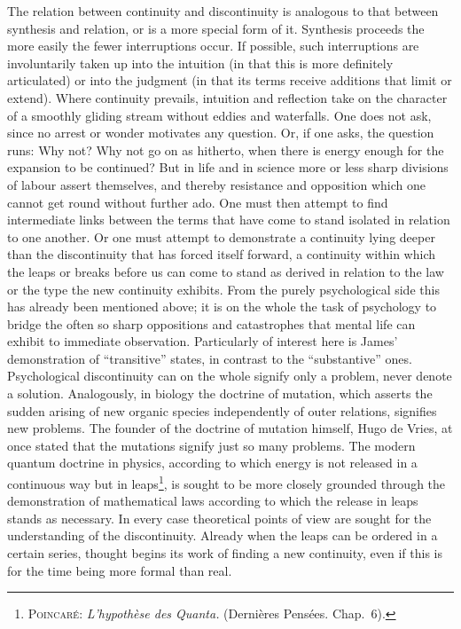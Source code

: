 \documentclass[12pt]{article}
\newcommand{\opage}[1]{\marginnote{\footnotesize\textit{[#1]}}}
\begin{document}
The relation between continuity and discontinuity is analogous to that
between synthesis and relation, or is a more special \opage{29}form of it. Synthesis
proceeds the more easily the fewer interruptions occur. If possible, such
interruptions are involuntarily taken up into the intuition (in that this is
more definitely articulated) or into the judgment (in that its terms receive
additions that limit or extend). Where continuity prevails, intuition and
reflection take on the character of a smoothly gliding stream without eddies
and waterfalls. One does not ask, since no arrest or wonder motivates any
question. Or, if one asks, the question runs: Why not? Why not go on as
hitherto, when there is energy enough for the expansion to be continued? But
in life and in science more or less sharp divisions of labour assert
themselves, and thereby resistance and opposition which one cannot get round
without further ado. One must then attempt to find intermediate links
between the terms that have come to stand isolated in relation to one
another. Or one must attempt to demonstrate a continuity lying deeper than
the discontinuity that has forced itself forward, a continuity within which
the leaps or breaks before us can come to stand as derived in relation to
the law or the type the new continuity exhibits. From the purely
psychological side this has already been mentioned above; it is on the whole
the task of psychology to bridge the often so sharp oppositions and
catastrophes that mental life can exhibit to immediate observation.
Particularly of interest here is James' demonstration of ``transitive''
states, in contrast to the ``substantive'' ones. Psychological discontinuity
can on the whole signify only a problem, never denote a solution. Analogously,
in biology the doctrine of mutation, which asserts the sudden arising of new
organic species independently of outer relations, signifies new problems.
The founder of the doctrine of mutation himself, Hugo de Vries, \opage{30}at once
stated that the mutations signify just so many problems. The modern quantum
doctrine in physics, according to which energy is not released in a
continuous way but in leaps\footnote{\textsc{Poincaré}: \textit{L'hypothèse
des Quanta.} (Dernières Pensées. Chap.~6).}, is sought to be more closely
grounded through the demonstration of mathematical laws according to which
the release in leaps stands as necessary. In every case theoretical points
of view are sought for the understanding of the discontinuity. Already when
the leaps can be ordered in a certain series, thought begins its work of
finding a new continuity, even if this is for the time being more formal
than real.
\end{document}
